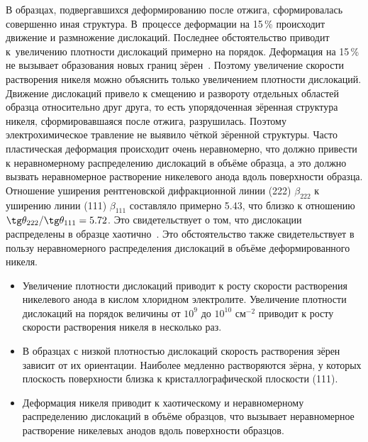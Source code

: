 В образцах, подвергавшихся деформированию после отжига, сформировалась совершенно иная структура. 
В~процессе деформации на 15\,\%  происходит движение и размножение дислокаций. 
Последнее обстоятельство приводит к~увеличению плотности дислокаций примерно на порядок. 
Деформация на 15\,\% не вызывает образования новых границ зёрен~\cite{vasil:bib16}. 
Поэтому увеличение скорости растворения никеля можно объяснить только увеличением плотности дислокаций.
Движение дислокаций привело к смещению и развороту отдельных областей образца относительно друг друга, то есть упорядоченная зёренная структура никеля, сформировавшаяся после отжига, разрушилась. 
Поэтому электрохимическое травление не выявило чёткой зёренной структуры. 
Часто пластическая деформация происходит очень неравномерно, что должно привести к неравномерному распределению дислокаций в объёме образца, а это должно вызвать неравномерное растворение никелевого анода вдоль поверхности образца. 
Отношение уширения рентгеновской дифракционной линии (222) $\beta_{222}$ к уширению линии (111) $\beta _{111}$ составляло примерно 5.43, что близко к отношению $\tg \theta _{222}/\tg \theta _{111} =5.72$. 
Это свидетельствует о том, что дислокации распределены в образце хаотично~\cite{vasil:bib15}.
Это обстоятельство также свидетельствует в пользу неравномерного распределения дислокаций в объёме деформированного никеля.

\smallskip


\begin{itemize}

\item[1.] Увеличение плотности дислокаций приводит к росту скорости растворения никелевого анода в кислом хлоридном электролите. 
Увеличение плотности дислокаций на порядок величины от $10^9$ до $10^{10}$ см$^{-2}$ приводит к росту скорости растворения никеля в несколько раз.

\item[2.] В образцах с низкой плотностью дислокаций скорость растворения зёрен зависит от их ориентации. 
Наиболее медленно растворяются зёрна, у которых плоскость поверхности близка к кристаллографической плоскости (111).

\item[3.] Деформация никеля приводит к хаотическому и неравномерному распределению дислокаций в объёме образцов, что вызывает неравномерное растворение никелевых анодов вдоль поверхности образцов.

\end{itemize}

